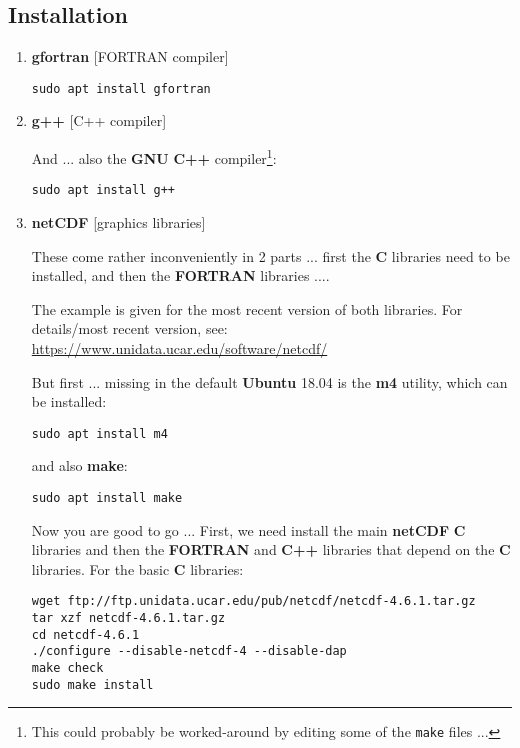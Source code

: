 \documentclass[11pt,fleqn]{book} %
\begin{document}
%
\subsection*{Installation}

\begin{enumerate}[noitemsep]
\setlength{\itemindent}{-.4in}

\vspace{4pt}
\item \textbf{gfortran} [FORTRAN compiler]

\begin{verbatim}
sudo apt install gfortran
\end{verbatim}

\item \textbf{g++} [C++ compiler]

And ... also the \textbf{GNU} \textbf{C++} compiler\footnote{This could probably be worked-around by editing some of the \texttt{make} files ...}:

\begin{verbatim}
sudo apt install g++
\end{verbatim}

\item \textbf{netCDF} [graphics libraries]

\noindent These come rather inconveniently in 2 parts ... first the \textbf{C} libraries need to be installed, and then the \textbf{FORTRAN} libraries ....

The example is given for the most recent version of both libraries. For details/most recent version, see: \href{https://www.unidata.ucar.edu/software/netcdf/#}{https://www.unidata.ucar.edu/software/netcdf/}

But first ... missing in the default \textbf{Ubuntu} 18.04 is the \textbf{m4} utility, which can be installed:

\begin{verbatim}
sudo apt install m4
\end{verbatim}

and also \textbf{make}:

\begin{verbatim}
sudo apt install make
\end{verbatim}

Now you are good to go ...
First, we need install the main \textbf{netCDF} \textbf{C} libraries and then the \textbf{FORTRAN} and \textbf{C++} libraries that depend on the \textbf{C} libraries. For the basic \textbf{C} libraries:
\begin{verbatim}
wget ftp://ftp.unidata.ucar.edu/pub/netcdf/netcdf-4.6.1.tar.gz
tar xzf netcdf-4.6.1.tar.gz
cd netcdf-4.6.1
./configure --disable-netcdf-4 --disable-dap
make check 
sudo make install
\end{verbatim}


\end{enumerate}
\end{document}
